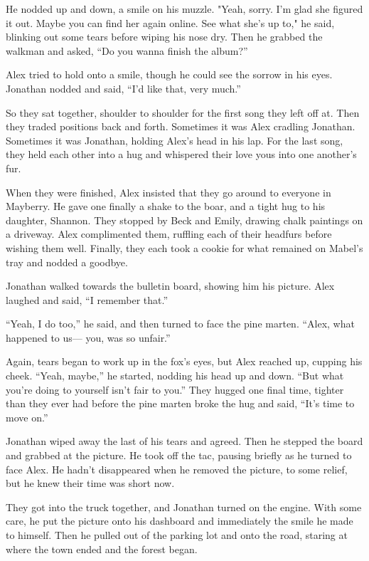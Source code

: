 He nodded up and down, a smile on his muzzle. "Yeah, sorry. I'm glad she
figured it out. Maybe you can find her again online. See what she's up
to," he said, blinking out some tears before wiping his nose dry. Then
he grabbed the walkman and asked, ``Do you wanna finish the album?''

Alex tried to hold onto a smile, though he could see the sorrow in his
eyes. Jonathan nodded and said, ``I'd like that, very much.''

So they sat together, shoulder to shoulder for the first song they left
off at. Then they traded positions back and forth. Sometimes it was Alex
cradling Jonathan. Sometimes it was Jonathan, holding Alex's head in his
lap. For the last song, they held each other into a hug and whispered
their love yous into one another's fur.

When they were finished, Alex insisted that they go around to everyone
in Mayberry. He gave one finally a shake to the boar, and a tight hug to
his daughter, Shannon. They stopped by Beck and Emily, drawing chalk
paintings on a driveway. Alex complimented them, ruffling each of their
headfurs before wishing them well. Finally, they each took a cookie for
what remained on Mabel's tray and nodded a goodbye.

Jonathan walked towards the bulletin board, showing him his picture.
Alex laughed and said, ``I remember that.''

``Yeah, I do too,'' he said, and then turned to face the pine marten.
``Alex, what happened to us--- you, was so unfair.''

Again, tears began to work up in the fox's eyes, but Alex reached up,
cupping his cheek. ``Yeah, maybe,'' he started, nodding his head up and
down. ``But what you're doing to yourself isn't fair to you.'' They hugged
one final time, tighter than they ever had before the pine marten broke
the hug and said, ``It's time to move on.''

Jonathan wiped away the last of his tears and agreed. Then he stepped
the board and grabbed at the picture. He took off the tac, pausing
briefly as he turned to face Alex. He hadn't disappeared when he removed
the picture, to some relief, but he knew their time was short now.

They got into the truck together, and Jonathan turned on the engine.
With some care, he put the picture onto his dashboard and immediately
the smile he made to himself. Then he pulled out of the parking lot and
onto the road, staring at where the town ended and the forest began.

